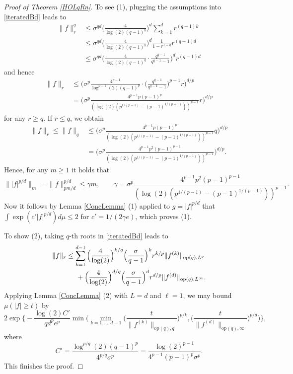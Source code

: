 \documentclass[a4paper,12pt]{amsart}
\numberwithin{equation}{section}
\theoremstyle{remark}
\begin{document}
\begin{proof}[Proof of Theorem \ref{HOLqRn}]
    To see (1), plugging the assumptions into \eqref{iteratedBd} leads to
    \begin{align*}
    \lVert f \rVert_r^q &\le \sigma^{qd} \Big(\frac{4}{\log(2) (q-1)^q}\Big)^d \sum_{k=1}^d r^{(q-1)k}\\
    &\le \sigma^{qd} \Big(\frac{4}{\log(2) (q-1)^q}\Big)^d \frac{1}{1-r^{1-q}} r^{(q-1)d}\\
    &\le \sigma^{qd} \Big(\frac{4}{\log(2) (q-1)^q} \cdot \frac{q^{q-1}}{q^{q-1}-1}\Big)^d r^{(q-1)d}
    \end{align*}
    and hence
    \begin{align*}
    \lVert f \rVert_r &\le \Big(\sigma^p \frac{4^{p-1}}{\log^{p-1}(2) (q-1)^p} \cdot \Big(\frac{q^{q-1}}{q^{q-1}-1}\Big)^{p-1}r\Big)^{d/p}\\
    &= \Big(\sigma^p \frac{4^{p-1}p(p-1)^p}{(\log(2)(p^{1/(p-1)}-(p-1)^{1/(p-1)}))^{p-1}} r\Big)^{d/p}
    \end{align*}
    for any $r \ge q$. If $r \le q$, we obtain
    \begin{align*}
    \lVert f \rVert_r \le \lVert f \rVert_q &\le \Big(\sigma^p \frac{4^{p-1}p(p-1)^p}{(\log(2)(p^{1/(p-1)}-(p-1)^{1/(p-1)}))^{p-1}} q\Big)^{d/p}\\
    &= \Big(\sigma^p \frac{4^{p-1}p^2(p-1)^{p-1}}{(\log(2)(p^{1/(p-1)}-(p-1)^{1/(p-1)}))^{p-1}}\Big)^{d/p}.
    \end{align*}
    Hence, for any $m\ge 1$ it holds that
    \[
    \lVert |f|^{p/d} \rVert_m = \lVert f \rVert_{pm/d}^{p/d} \le \gamma m,\qquad \gamma = \sigma^p \frac{4^{p-1}p^2(p-1)^{p-1}}{(\log(2)(p^{1/(p-1)}-(p-1)^{1/(p-1)}))^{p-1}}.
    \]
    Now it follows by Lemma \ref{ConcLemma} (1) applied to $g=|f|^{p/d}$ that $\int \exp(c'|f|^{p/d}) d\mu \le 2$ for $c'=1/(2\gamma e)$, which proves (1).

    To show (2), taking $q$-th roots in \eqref{iteratedBd} leads to
    \begin{align*}
        \lVert f \rVert_r &\le \sum_{k=1}^{d-1} \Big(\frac{4}{\log(2)}\Big)^{k/q} \Big(\frac{\sigma}{q-1}\Big)^k r^{k/p} \lVert f^{(k)} \rVert_{\mathrm{op}(q),L^q}\\
        &\hspace{0.5cm} + \Big(\frac{4}{\log(2)}\Big)^{d/q} \Big(\frac{\sigma}{q-1}\Big)^d r^{d/p} \lVert f^{(d)} \rVert_{\mathrm{op}(q),L^\infty}.
    \end{align*}
    Applying Lemma \ref{ConcLemma} (2) with $L=d$ and $\ell=1$, we may bound $\mu(|f| \ge t)$ by
    \[
    2 \exp\Big\{- \frac{\log(2)C'}{qd^pe^p} \min\Big(\min_{k=1, \ldots,d-1} \Big(\frac{t}{\lVert f^{(k)} \rVert_{\mathrm{op}(q),q}}\Big)^{p/k}, \Big(\frac{t}{\lVert f^{(d)} \rVert_{\mathrm{op}(q),\infty}}\Big)^{p/d}\Big)\Big\},
    \]
    where
    \[
    C'= \frac{\log^{p/q}(2)(q-1)^{p}}{4^{p/q}\sigma^p} = \frac{\log(2)^{p-1}}{4^{p-1}(p-1)^p\sigma^p}.
    \]
    This finishes the proof.
\end{proof}
\end{document}
